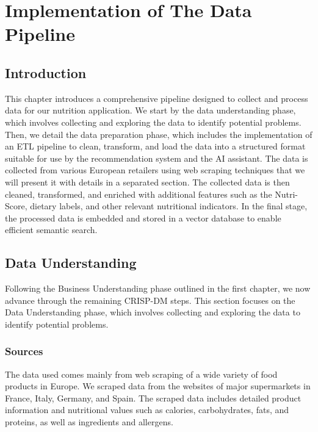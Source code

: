 \chapter{Implementation of The Data Pipeline}
\section*{Introduction}

This chapter introduces a comprehensive pipeline designed to collect
and process data for our nutrition application. We start by the data
understanding phase, which involves collecting and exploring the data
to identify potential problems. Then, we detail the data preparation
phase, which includes the implementation of an ETL pipeline to clean,
transform, and load the data into a structured format suitable for use by
the recommendation system and the AI assistant. The data is collected
from various European retailers using web scraping techniques that we
will present it with details in a separated section. The collected data is
then cleaned, transformed, and enriched with additional features such as
the Nutri-Score, dietary labels, and other relevant nutritional indicators.
In the final stage, the processed data is embedded and stored in a vector
database to enable efficient semantic search.
\section{Data Understanding}
Following the Business Understanding phase outlined in the first
chapter, we now advance through the remaining CRISP-DM steps.
This section focuses on the Data Understanding phase, which involves
collecting and exploring the data to identify potential problems.

\subsection{Sources}

\par The data used comes mainly from web scraping of a wide variety of
food products in Europe. We scraped data from the websites of major
supermarkets in France, Italy, Germany, and Spain.
The scraped data includes detailed product information and nutritional
values such as calories, carbohydrates, fats, and proteins, as well as
ingredients and allergens.


